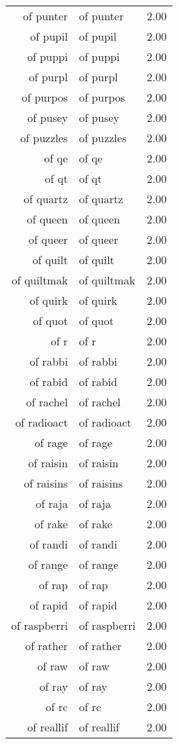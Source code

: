 \begin{table}[ht]
\begin{tabular}{rlr}
  of punter & of punter & 2.00 \\ 
  of pupil & of pupil & 2.00 \\ 
  of puppi & of puppi & 2.00 \\ 
  of purpl & of purpl & 2.00 \\ 
  of purpos & of purpos & 2.00 \\ 
  of pusey & of pusey & 2.00 \\ 
  of puzzles & of puzzles & 2.00 \\ 
  of qe & of qe & 2.00 \\ 
  of qt & of qt & 2.00 \\ 
  of quartz & of quartz & 2.00 \\ 
  of queen & of queen & 2.00 \\ 
  of queer & of queer & 2.00 \\ 
  of quilt & of quilt & 2.00 \\ 
  of quiltmak & of quiltmak & 2.00 \\ 
  of quirk & of quirk & 2.00 \\ 
  of quot & of quot & 2.00 \\ 
  of r & of r & 2.00 \\ 
  of rabbi & of rabbi & 2.00 \\ 
  of rabid & of rabid & 2.00 \\ 
  of rachel & of rachel & 2.00 \\ 
  of radioact & of radioact & 2.00 \\ 
  of rage & of rage & 2.00 \\ 
  of raisin & of raisin & 2.00 \\ 
  of raisins & of raisins & 2.00 \\ 
  of raja & of raja & 2.00 \\ 
  of rake & of rake & 2.00 \\ 
  of randi & of randi & 2.00 \\ 
  of range & of range & 2.00 \\ 
  of rap & of rap & 2.00 \\ 
  of rapid & of rapid & 2.00 \\ 
  of raspberri & of raspberri & 2.00 \\ 
  of rather & of rather & 2.00 \\ 
  of raw & of raw & 2.00 \\ 
  of ray & of ray & 2.00 \\ 
  of rc & of rc & 2.00 \\ 
  of reallif & of reallif & 2.00 \\ 

\end{tabular}
\end{table}
